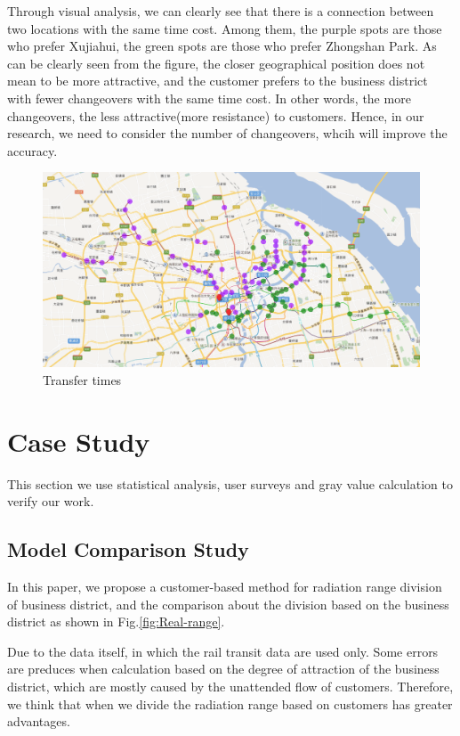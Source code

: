 \documentclass[journal]{IEEEtran}
\begin{document}
Through visual analysis, we can clearly see that there is a connection between two locations with the same time cost. Among them, the purple spots are those who prefer Xujiahui, the green spots are those who prefer Zhongshan Park. As can be clearly seen from the figure, the closer geographical position does not mean to be more attractive, and the customer prefers to the business district with fewer changeovers with the same time cost. In other words, the more changeovers, the less attractive(more resistance) to customers. Hence, in our research, we need to consider the number of changeovers, whcih will improve the accuracy.





\begin{figure}[tb]
\centering
\includegraphics[width=1\columnwidth]{figure10.png}
\caption{Transfer times}
\label{fig:Transfer-times}
\end{figure}



\section{Case Study}

This section we use statistical analysis, user surveys and gray value calculation to verify our work.

\subsection{Model Comparison Study}

In this paper, we propose a customer-based method for radiation range division of business district, and the comparison about the division based on the business district as shown in Fig.\ref{fig:Real-range}.

Due to the data itself, in which the rail transit data are used only. Some errors are preduces when calculation based on the degree of attraction of the business district, which are mostly caused by the unattended flow of customers. Therefore, we think that when we divide the radiation range based on customers has greater advantages.
\end{document}
